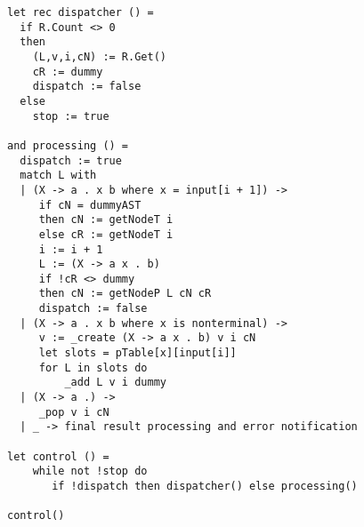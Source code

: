 \documentclass[12pt]{article}  %
\theoremstyle{definition}
\theoremstyle{remark}
\begin{document}
\begin{verbatim}
let rec dispatcher () = 
  if R.Count <> 0 
  then 
    (L,v,i,cN) := R.Get() 
    cR := dummy
    dispatch := false 
  else 
    stop := true 

and processing () =  
  dispatch := true 
  match L with
  | (X -> a . x b where x = input[i + 1]) ->
     if cN = dummyAST 
     then cN := getNodeT i
     else cR := getNodeT i
     i := i + 1
     L := (X -> a x . b)
     if !cR <> dummy
     then cN := getNodeP L cN cR 
     dispatch := false 
  | (X -> a . x b where x is nonterminal) ->
     v := _create (X -> a x . b) v i cN
     let slots = pTable[x][input[i]]  
     for L in slots do             
         _add L v i dummy
  | (X -> a .) -> 
     _pop v i cN
  | _ -> final result processing and error notification

let control () = 
    while not !stop do 
       if !dispatch then dispatcher() else processing() 

control() 

\end{verbatim}
\end{document}
